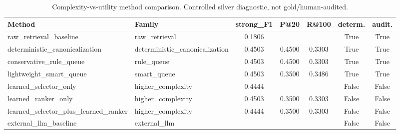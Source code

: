 \begin{table}[ht]
\centering
\caption{Complexity-vs-utility method comparison. Controlled silver diagnostic, not gold/human-audited.}
\label{tab:complexity_utility}
\begin{tabular}{llccccc}
\toprule
Method & Family & strong\_F1 & P@20 & R@100 & determ. & audit. \\
\midrule
raw_retrieval_baseline & raw_retrieval & 0.1806 &  &  & True & True \\
deterministic_canonicalization & deterministic_canonicalization & 0.4503 & 0.4500 & 0.3303 & True & True \\
conservative_rule_queue & rule_queue & 0.4503 & 0.4500 & 0.3303 & True & True \\
lightweight_smart_queue & smart_queue & 0.4503 & 0.3500 & 0.3486 & True & True \\
learned_selector_only & higher_complexity & 0.4444 &  &  & False & False \\
learned_ranker_only & higher_complexity & 0.4503 & 0.3500 & 0.3303 & False & False \\
learned_selector_plus_learned_ranker & higher_complexity & 0.4444 & 0.3500 & 0.3303 & False & False \\
external_llm_baseline & external_llm &  &  &  & False & False \\
\bottomrule
\end{tabular}
\end{table}